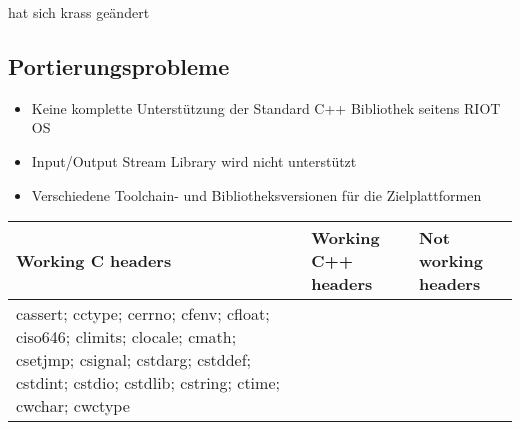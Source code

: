 \documentclass[10pt,a4paper]{article}
\begin{document}
hat sich krass geändert

\subsection{Portierungsprobleme}

\begin{itemize}
\item Keine komplette Unterstützung der Standard C++ Bibliothek seitens RIOT OS
\item Input/Output Stream Library wird nicht unterstützt
\item Verschiedene Toolchain- und Bibliotheksversionen für die Zielplattformen
\end{itemize}


\begin{center}
  \begin{tabular}{ | p{3cm} | p{3cm} | p{3cm} |}
    \hline
    Working \newline C headers & Working \newline C++ headers & Not working \newline headers \\ \hline
cassert; \newline 
cctype; \newline
cerrno; \newline
cfenv; \newline
cfloat; \newline
ciso646; \newline 
climits; \newline
clocale; \newline
cmath; \newline
csetjmp; \newline
csignal; \newline
cstdarg; \newline
cstddef; \newline
cstdint; \newline
cstdio; \newline
cstdlib; \newline
cstring; \newline
ctime; \newline
cwchar; \newline
cwctype & 


\end{tabular}
\end{center}
\end{document}

